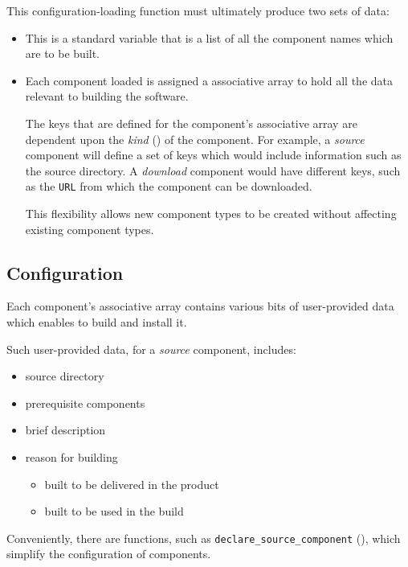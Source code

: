 This configuration-loading function must ultimately produce two sets
of data:

\begin{itemize}
\item \lmsbwcomponents

  This is a standard \gnumake variable that is a list of all the
  component names which are to be built.

\item {}

  Each component loaded is assigned a \gmsl{} associative
  array to hold all the data relevant to building the software.

  The keys that are defined for the component's associative array are
  dependent upon the \emph{kind} () of the
  component.  For example, a \emph{source} component will define a set
  of keys which would include information such as the source
  directory.  A \emph{download} component would have different keys,
  such as the \texttt{URL} from which the component can be downloaded.

  This flexibility allows new component types to be created without
  affecting existing component types.
\end{itemize}


\subsection{ Configuration}

Each component's associative array contains various bits of
user-provided data which enables \lmsbw to build and install it.

Such user-provided data, for a \emph{source} component, includes:

\begin{itemize}
\item source directory
\item prerequisite components
\item brief description
\item reason for building
  \begin{itemize}
  \item built to be delivered in the product
  \item built to be used in the build
  \end{itemize}
\end{itemize}

Conveniently, there are \lmsbw functions, such as
\texttt{declare\_source\_component}
(), which simplify the
configuration of components.

